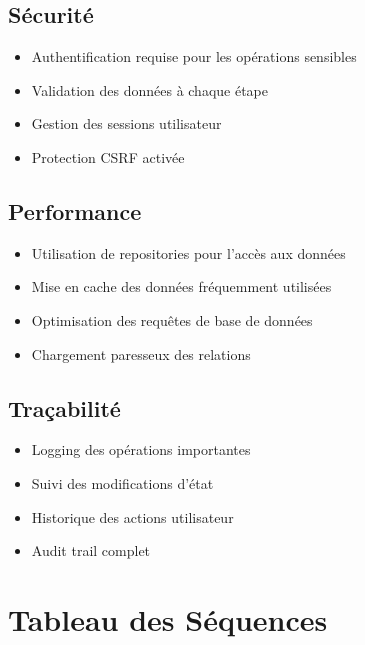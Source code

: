 \documentclass[12pt,a4paper]{article}
\begin{document}
\subsection{Sécurité}
\begin{itemize}
    \item Authentification requise pour les opérations sensibles
    \item Validation des données à chaque étape
    \item Gestion des sessions utilisateur
    \item Protection CSRF activée
\end{itemize}

\subsection{Performance}
\begin{itemize}
    \item Utilisation de repositories pour l'accès aux données
    \item Mise en cache des données fréquemment utilisées
    \item Optimisation des requêtes de base de données
    \item Chargement paresseux des relations
\end{itemize}

\subsection{Traçabilité}
\begin{itemize}
    \item Logging des opérations importantes
    \item Suivi des modifications d'état
    \item Historique des actions utilisateur
    \item Audit trail complet
\end{itemize}

\section{Tableau des Séquences}
\end{document}

